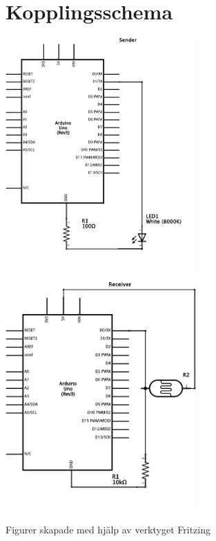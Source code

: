 \section{Kopplingsschema} %
\label{sec:kopplingsschema}
\begin{center}
    \includegraphics[width=0.55\textwidth]{res/img/sender_schem}
\end{center}

\begin{center}
    \includegraphics[width=0.55\textwidth]{res/img/receiver_schem}
\end{center}
\vfill
\begin{center}
    \small{Figurer skapade med hjälp av verktyget Fritzing \cite{fritz}}    
\end{center}

